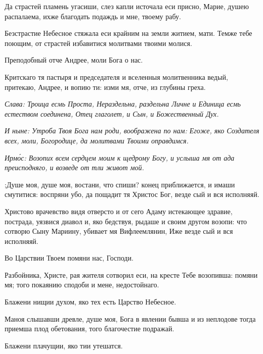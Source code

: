 
Да страстей пламень угасиши, слез капли источала еси присно, Марие, душею распалаема, ихже благодать подаждь и мне, твоему рабу.


Безстрастие Небесное стяжала еси крайним на земли житием, мати. Темже тебе поющим, от страстей избавитися молитвами твоими молися.

Преподобный отче Андрее, моли Бога о нас.

Критскаго тя пастыря и председателя и вселенныя молитвенника ведый, притекаю, Андрее, и вопию ти: изми мя, отче, из глубины греха.

\itshape Слава\normalfont{}: Троица есмь Проста, Нераздельна, раздельна Личне и Единица есмь естеством соединена, Отец глаголет, и Сын, и Божественный Дух.

\itshape И ныне\normalfont{}: Утроба Твоя Бога нам роди, воображена по нам: Егоже, яко Создателя всех, моли, Богородице, да молитвами Твоими оправдимся.

\itshape Ирм\'{о}с\normalfont{}: Возопих всем сердцем моим к щедрому Богу, и услыша мя от ада преисподняго, и возведе от тли живот мой. 


;Душе моя, душе моя, востани, что спиши? конец приближается, и имаши смутитися: воспряни убо, да пощадит тя Христос Бог, везде сый и вся исполняяй. 


Христово врачевство видя отверсто и от сего Адаму истекающее здравие, пострада, уязвися диавол и, яко бедствуя, рыдаше и своим другом возопи: что сотворю Сыну Мариину, убивает мя Вифлеемлянин, Иже везде сый и вся исполняяй. 


Во Царствии Твоем помяни нас, Господи.

Разбойника, Христе, рая жителя сотворил еси, на кресте Тебе возопивша: помяни мя; того покаянию сподоби и мене, недостойнаго.

Блажени нищии духом, яко тех есть Царство Небесное.

Маноя слышавши древле, душе моя, Бога в явлении бывша и из неплодове тогда приемша плод обетования, того благочестие подражай.

Блажени плачущии, яко тии утешатся.

